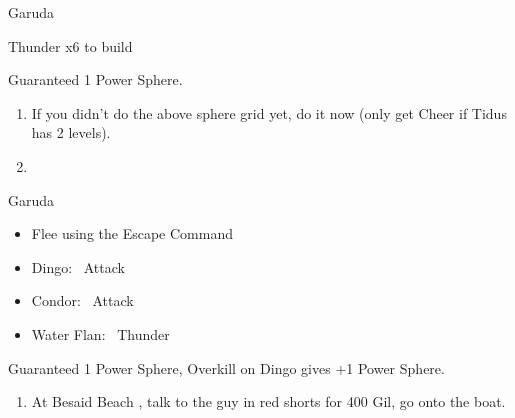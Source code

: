 \begin{battle}{Garuda}
    \begin{itemize}
        \summon{\valefor}
        \valeforf Thunder x6 to build \od
    \end{itemize}
    Guaranteed 1 Power Sphere.
\end{battle}
\begin{enumerate}[resume]
    \item If you didn't do the above sphere grid yet, do it now (only get Cheer if Tidus has 2 levels).
    \item \formation{\tidus}{\yuna}{\lulu}
\end{enumerate}
\begin{battle}{Garuda}
    \begin{itemize}
        \item Flee using the Escape Command
    \end{itemize}
\end{battle}
\begin{encounters}
    \begin{itemize}
        \item Dingo: \tidus\ Attack
        \item Condor: \wakka\ Attack
        \item Water Flan: \lulu\ Thunder
    \end{itemize}
    Guaranteed 1 Power Sphere, Overkill on Dingo gives +1 Power Sphere.
\end{encounters}
\begin{enumerate}[resume]
    \item At Besaid Beach \save, talk to the guy in red shorts for 400 Gil, go onto the boat.
\end{enumerate}